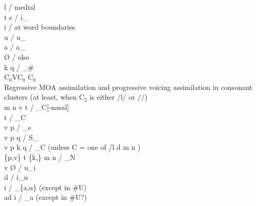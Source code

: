 \documentclass[11pt]{article}
\begin{document}
 \textrightarrow\hspace{0pt} l / medial \\
t \textrightarrow\hspace{0pt} s / i_ \\
 \textrightarrow\hspace{0pt} i / at word boundaries \\
 \textrightarrow\hspace{0pt} u / u_ \\
 \textrightarrow\hspace{0pt} a / a_ \\
 \textrightarrow\hspace{0pt} \O\hspace{0pt} / else \\
 \textrightarrow\hspace{0pt} k q / _\# \\
C$_0$VC$_0$ \textrightarrow\hspace{0pt} C$_0$\textipa{:} \\
Regressive MOA assimilation and progressive voicing assimilation in consonant clusters (at least, when C$_2$ is either /l/ or //) \\
m n  \textrightarrow\hspace{0pt} v t  / _C[-nasal] \\
 \textrightarrow\hspace{0pt} t / _C \\
v \textrightarrow\hspace{0pt} p / _s \\
v  \textrightarrow\hspace{0pt} p q / S_ \\
v  \textrightarrow\hspace{0pt} p k q / _C (unless C = one of /l d m n ) \\
\{p,v\} t \{k,\} \textrightarrow\hspace{0pt} m n  / _N \\
v \textrightarrow\hspace{0pt} \O\hspace{0pt} / u_i \\
d \textrightarrow\hspace{0pt}  / i_u \\
 \textrightarrow\hspace{0pt} i / _\{a,u\} (except in \#U) \\
ad \textrightarrow\hspace{0pt} i / _a (except in \#U?)
\end{document}
